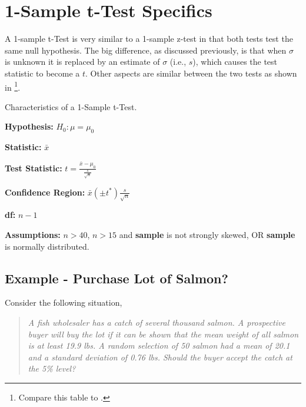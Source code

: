 \documentclass[10pt,openany]{book}\usepackage[]{graphicx}\usepackage[]{color}
\begin{document}
\vspace{-24pt}
\section{1-Sample t-Test Specifics} \label{sect:t1test}
A 1-sample t-Test is very similar to a 1-sample z-test in that both tests test the same null hypothesis.  The big difference, as discussed previously, is that when $\sigma$ is unknown it is replaced by an estimate of $\sigma$ (i.e., $s$), which causes the test statistic to become a $t$.  Other aspects are similar between the two tests as shown in \footnote{Compare this table to .}.

\begin{table}[htbp]
  \caption{Characteristics of a 1-Sample t-Test.}
  \label{tab:1tspec}
    \begin{Itemize}
      \item \textbf{Hypothesis:} $H_{0}:\mu=\mu_{0}$
      \item \textbf{Statistic:} $\bar{x}$
      \item \textbf{Test Statistic:} $t=\frac{\bar{x}-\mu_{0}}{\frac{s}{\sqrt{n}}}$
      \item \textbf{Confidence Region:} $\bar{x}(\pm t^{*})\frac{s}{\sqrt{n}}$
      \item \textbf{df:} $n-1$
      \item \textbf{Assumptions:} $n>40$, $n>15$ and \textbf{sample} is not strongly skewed, OR \textbf{sample} is normally distributed.
    \end{Itemize}
\end{table}

\subsection{Example - Purchase Lot of Salmon?}
Consider the following situation,
\begin{quote}
\textsl{A fish wholesaler has a catch of several thousand salmon.  A prospective buyer will buy the lot if it can be shown that the mean weight of all salmon is at least 19.9 lbs.  A random selection of 50 salmon had a mean of 20.1 and a standard deviation of 0.76 lbs.  Should the buyer accept the catch at the 5\% level?}
\end{quote}
\end{document}
